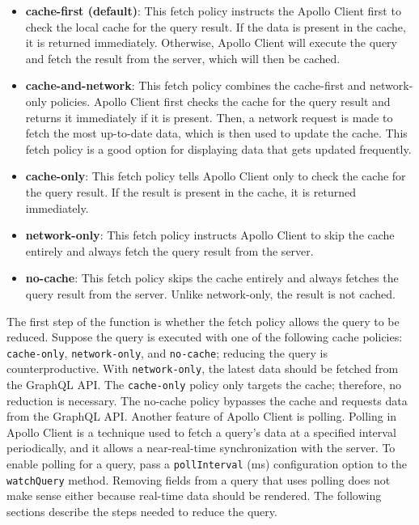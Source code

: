 \begin{itemize}
  \item \textbf{cache-first (default)}: This fetch policy instructs the Apollo Client first to check the local cache for the query result. If the data is present in the cache, it is returned immediately. Otherwise, Apollo Client will execute the query and fetch the result from the server, which will then be cached.
  \item \textbf{cache-and-network}: This fetch policy combines the cache-first and network-only policies. Apollo Client first checks the cache for the query result and returns it immediately if it is present. Then, a network request is made to fetch the most up-to-date data, which is then used to update the cache. This fetch policy is a good option for displaying data that gets updated frequently.
  \item \textbf{cache-only}: This fetch policy tells Apollo Client only to check the cache for the query result. If the result is present in the cache, it is returned immediately.
  \item \textbf{network-only}: This fetch policy instructs Apollo Client to skip the cache entirely and always fetch the query result from the server.
  \item \textbf{no-cache}: This fetch policy skips the cache entirely and always fetches the query result from the server. Unlike network-only, the result is not cached.
\end{itemize}

\noindent The first step of the function is whether the fetch policy allows the query to be reduced. Suppose the query is executed with one of the following cache policies: \texttt{cache-only}, \texttt{network-only}, and \texttt{no-cache}; reducing the query is counterproductive. With \texttt{network-only}, the latest data should be fetched from the GraphQL \ac{API}. The \texttt{cache-only} policy only targets the cache; therefore, no reduction is necessary. The no-cache policy bypasses the cache and requests data from the GraphQL \ac{API}. Another feature of Apollo Client is polling. Polling in Apollo Client is a technique used to fetch a query's data at a specified interval periodically, and it allows a near-real-time synchronization with the server. To enable polling for a query, pass a \texttt{pollInterval} (ms) configuration option to the \texttt{watchQuery} method. Removing fields from a query that uses polling does not make sense either because real-time data should be rendered. The following sections describe the steps needed to reduce the query.

